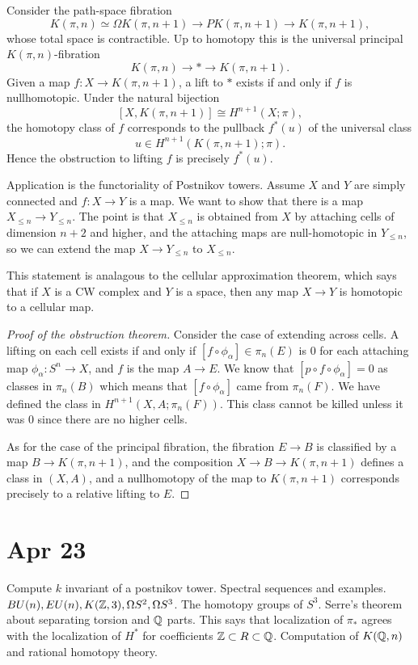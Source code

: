 \documentclass[12pt]{article}
\begin{document}
\begin{example}
Consider the path-space fibration
\[
K(\pi,n)\simeq \Omega K(\pi,n+1)\longrightarrow PK(\pi,n+1)\longrightarrow K(\pi,n+1),
\]
whose total space is contractible. Up to homotopy this is the universal principal \(K(\pi,n)\)-fibration
\[
K(\pi,n)\to *\to K(\pi,n+1).
\]
Given a map \(f:X\to K(\pi,n+1)\), a lift to \(*\) exists if and only if \(f\) is nullhomotopic. Under the natural bijection
\[
[X,K(\pi,n+1)]\cong H^{n+1}(X;\pi),
\]
the homotopy class of \(f\) corresponds to the pullback \(f^*(u)\) of the universal class
\[
u\in H^{n+1}(K(\pi,n+1);\pi).
\]
Hence the obstruction to lifting \(f\) is precisely \(f^*(u)\).\end{example}

Application is the functoriality of Postnikov towers. Assume $X$ and $Y$ are simply connected and $f:X \to Y$ is a map. We want to show that there is a map $X_{\leq n} \to Y_{\leq n}$. The point is that $X_{\leq n}$ is obtained from $X$ by attaching cells of dimension $n+2$ and higher, and the attaching maps are null-homotopic in $Y_{\leq n}$, so we can extend the map $X \to Y_{\leq n}$ to $X_{\leq n}$.

This statement is analagous to the cellular approximation theorem, which says that if $X$ is a CW complex and $Y$ is a space, then any map $X \to Y$ is homotopic to a cellular map. 

\begin{proof}
    [Proof of the obstruction theorem]  Consider the case of extending across cells. A lifting on each cell exists if and only if $[f \circ \phi_\alpha] \in \pi_n(E)$ is $0$ for each attaching map $\phi_\alpha: S^n \to X$, and $f$ is the map $A\to E$. We know that $[p \circ f \circ \phi_\alpha] = 0$ as classes in $\pi_n(B)$ which means that $[f \circ \phi_\alpha]$ came from $\pi_n(F)$. We have defined the class in $H^{n+1}(X,A;\pi_n(F))$. This class cannot be killed unless it was $0$ since there are no higher cells.

As for the case of the principal fibration, the fibration $E\to B$ is classified by a map $B \to K(\pi,n+1)$, and the composition $X \to B \to K(\pi,n+1)$ defines a class in $(X,A)$, and a nullhomotopy of the map to $K(\pi,n+1)$ corresponds precisely to a relative lifting to $E$.
\end{proof}

\section{Apr 23}
Compute $k$ invariant of a postnikov tower. Spectral sequences and examples. $BU(n), EU(n), K(\mathbb{Z},3),\Omega S^2, \Omega S^3$. The homotopy groups of $S^3$. Serre's theorem about separating torsion and $\mathbb{Q}$ parts. This says that localization of $\pi_*$ agrees with the localization of $H^*$ for coefficients $\mathbb{Z}\subset R\subset \mathbb{Q}$. Computation of $K(\mathbb{Q},n)$ and rational homotopy theory.
\end{document}
